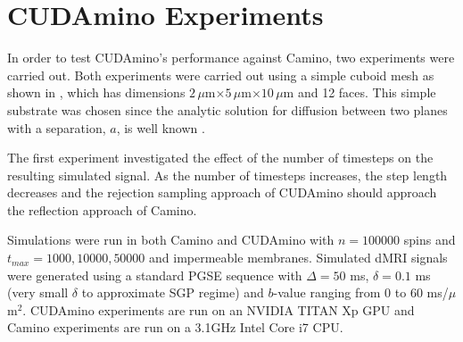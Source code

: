 \section{CUDAmino Experiments}
\label{sec:cudamino_experiments}
In order to test CUDAmino's performance against Camino, two experiments were carried out.
Both experiments were carried out using a simple cuboid mesh as shown in , which has dimensions $2\,\mu$m$\times5\,\mu$m$\times10\,\mu$m and 12 faces.
This simple substrate was chosen since the analytic solution for diffusion between two planes with a separation, $a$, is well known \cite{Callaghan1995,Linse1995}.

The first experiment investigated the effect of the number of timesteps on the resulting simulated signal.
As the number of timesteps increases, the step length decreases and the rejection sampling approach of CUDAmino should approach the reflection approach of Camino.

Simulations were run in both Camino and CUDAmino with $n = 100000$ spins and $t_{max} = 1000, 10000, 50000$ and impermeable membranes.
Simulated \ac{dMRI} signals were generated using a standard \ac{PGSE} sequence with $\Delta = 50$ ms, $\delta = 0.1$ ms (very small $\delta$ to approximate \ac{SGP} regime) and $b$-value ranging from 0 to 60 ms/$\mu$m$^2$.
CUDAmino experiments are run on an NVIDIA TITAN Xp \ac{GPU} and Camino experiments are run on a 3.1GHz Intel Core i7 \ac{CPU}. 



